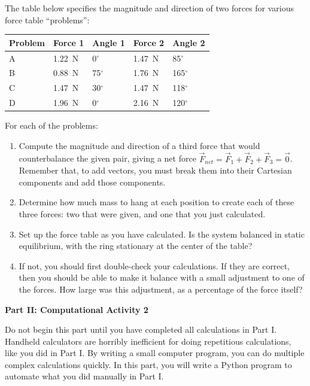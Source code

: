 \documentclass[11pt]{article}
\begin{document}
\small

The table below specifies the magnitude and direction of two forces for
various force table ``problems'':

\begin{center}
\begin{tabular}{l|ll|ll}
\hline
Problem & Force 1 & Angle 1 & Force 2 & Angle 2 \\
\hline
A & 1.22~N  & 0$^\circ$ & 1.47~N & 85$^\circ$ \\
B & 0.88~N & 75$^\circ$ & 1.76~N & 165$^\circ$ \\
C & 1.47~N & 30$^\circ$ & 1.47~N & 118$^\circ$ \\
D & 1.96~N & 0$^\circ$ & 2.16~N & 120$^\circ$ \\
\hline
\end{tabular}
\end{center}




\noindent For each of the problems:
\begin{enumerate}
\item Compute the magnitude and direction of a third force that would 
counterbalance the given pair, giving a net force
${\vec F}_{net} = {\vec F}_1 + {\vec F}_2 + {\vec F}_3 = \vec 0$.
Remember that, to add vectors, you must break them into their Cartesian
components and add those components.
\item Determine how much mass to hang at each position 
 to create each of these three forces: two that were given, and one that
 you just calculated.
\item Set up the force table as you have calculated.  Is the system balanced
  in static equilibrium, with the ring stationary at the center of the table?  
\item If not, you should first double-check your calculations.  If they are 
  correct, then you should be able to make it balance with a small 
  adjustment to one of the forces.  How large was this adjustment,
  as a percentage of the force itself?
\end{enumerate}  
\begin{center}
\textbf{Part II: Computational Activity 2}
\end{center}
Do not begin this part until you have completed all calculations in Part I. Handheld calculators are horribly inefficient for doing repetitious calculations, like you did in Part I. By writing a small computer program, you can do multiple complex calculations quickly. In this part, you will write a Python program to automate what you did manually in Part I.
\end{document}

